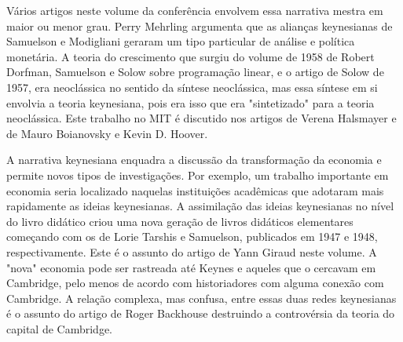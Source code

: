 \documentclass[12pt]{article}
\begin{document}
Vários artigos neste volume da conferência envolvem essa narrativa mestra em maior ou menor grau. Perry Mehrling argumenta que as alianças keynesianas de Samuelson e Modigliani geraram um tipo particular de análise e política monetária. A teoria do crescimento que surgiu do volume de 1958 de Robert Dorfman, Samuelson e Solow sobre programação linear, e o artigo de Solow de 1957, era neoclássica no sentido da síntese neoclássica, mas essa síntese em si envolvia a teoria keynesiana, pois era isso que era "sintetizado" para a teoria neoclássica. Este trabalho no MIT é discutido nos artigos de Verena Halsmayer e de Mauro Boianovsky e Kevin D. Hoover.

A narrativa keynesiana enquadra a discussão da transformação da economia e permite novos tipos de investigações. Por exemplo, um trabalho importante em economia seria localizado naquelas instituições acadêmicas que adotaram mais rapidamente as ideias keynesianas. A assimilação das ideias keynesianas no nível do livro didático criou uma nova geração de livros didáticos elementares começando com os de Lorie Tarshis e Samuelson, publicados em 1947 e 1948, respectivamente. Este é o assunto do artigo de Yann Giraud neste volume. A "nova" economia pode ser rastreada até Keynes e aqueles que o cercavam em Cambridge, pelo menos de acordo com historiadores com alguma conexão com Cambridge. A relação complexa, mas confusa, entre essas duas redes keynesianas é o assunto do artigo de Roger Backhouse destruindo a controvérsia da teoria do capital de Cambridge.
\end{document}
